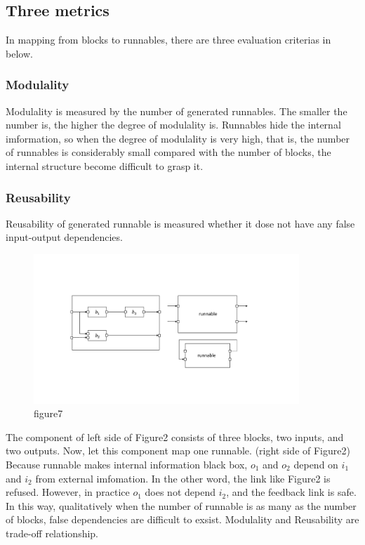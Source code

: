 \documentclass[conference,compsoc]{IEEEtran}
\begin{document}
\subsection{Three metrics}
 In mapping from blocks to runnables, there are three evaluation criterias in below.
\subsubsection{Modulality}
 Modulality is measured by the number of generated runnables.
The smaller the number is, the higher the degree of modulality is.
Runnables hide the internal imformation, so when the degree of modulality is very high, that is, the number of runnables is considerably small compared with the number of blocks,
the internal structure become difficult to grasp it.
\subsubsection{Reusability}
 Reusability of generated runnable is measured whether it dose not have any false input-output dependencies.
\begin{figure}
	\centering
	\includegraphics[width=10cm,clip]{figure6.pdf}
	\caption{figure7}
	\label{fig7}
\end{figure}
 The component of left side of Figure2 consists of three blocks, two inputs, and two outputs.
Now, let this component map one runnable. (right side of Figure2)
Because runnable makes internal information black box, $o_1$ and $o_2$ depend on $i_1$ and $i_2$ from external imfomation.
In the other word, the link like Figure2 is refused.
However, in practice $o_1$ does not depend $i_2$, and the feedback link is safe. 
In this way, qualitatively when the number of runnable is as many as the number of blocks, false dependencies are difficult to exsist.
Modulality and Reusability are trade-off relationship.
\end{document}
